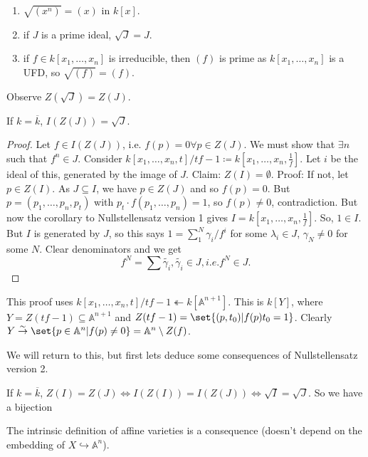 \documentclass{article}
\newcommand{\A}{\mathbb{A}}
\begin{document}
\begin{eg}
    \begin{enumerate}[label=(\arabic*)]
        \item $\sqrt{(x^n)} = (x)$ in $k[x]$.
        \item if $J$ is a prime ideal, $\sqrt{J} = J$.
        \item if $f \in k[x_1, \dotsc, x_n]$ is irreducible, then $(f)$ is prime as $k[x_1, \dotsc, x_n]$ is a UFD, so $\sqrt{(f)} = (f)$.
    \end{enumerate}
\end{eg}
Observe $Z(\sqrt{J}) = Z(J)$.
\begin{thm}[Nullstellensatz, v2]
    If $k = \overline{k}$, $I(Z(J)) = \sqrt{J}$.
\end{thm}
\begin{proof}
    Let $f \in I(Z(J))$, i.e. $f(p) = 0 \forall p \in Z(J)$. We must show that $\exists n$ such that $f^n \in J$.
    Consider $k[x_1, \dotsc, x_n, t]/tf-1 \coloneqq k[x_1, \dotsc, x_n, \frac{1}{f}]$.
    Let $i$ be the ideal of this, generated by the image of $J$.
    Claim: $Z(I) = \emptyset$. Proof: If not, let $p \in Z(I)$. As $J \subseteq I$, we have $p \in Z(J)$ and so $f(p) = 0$. But $p=(p_1, \dotsc, p_n, p_t)$ with $p_t \cdot f(p_1, \dotsc, p_n) = 1$, so $f(p) \neq 0$, contradiction.
    But now the corollary to Nullstellensatz version 1 gives $I=k[x_1, \dotsc, x_n, \frac{1}{f}]$. So, $1 \in I$. But $I$ is generated by $J$, so this says $1 = \sum_1^N \gamma_i/f^i$ for some $\lambda_i \in J$, $\gamma_N \neq 0$ for some $N$.
    Clear denominators and we get
    \begin{equation*}
        f^N = \sum \tilde{\gamma_i}, \tilde{\gamma_i} \in J, i.e. f^N \in J.
    \end{equation*}
\end{proof}
\begin{remark}
    This proof uses $k[x_1, \dotsc, x_n, t]/tf-1 \twoheadleftarrow k[\A^{n+1}]$. This is $k[Y]$, where $Y = Z(tf-1) \subseteq \A^{n+1}$ and $Z(tf-1) = \set{(p, t_0) | f(p) t_0 = 1}$.
    Clearly $Y \overset{\sim}{\rightarrow} \set{p \in \A^n | f(p) \neq 0} = \A^n \setminus Z(f)$.
\end{remark}
We will return to this, but first lets deduce some consequences of Nullstellensatz version 2.
\begin{cor}
    If $k = \overline{k}$, $Z(I) = Z(J) \iff I(Z(I)) = I(Z(J)) \iff \sqrt{I} = \sqrt{J}$.
    So we have a bijection
\end{cor}
The intrinsic definition of affine varieties is a consequence (doesn't depend on the embedding of $X \hookrightarrow \A^n$).
\end{document}
